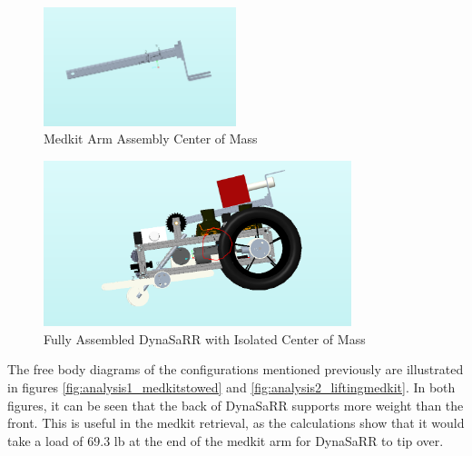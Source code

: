 \begin{figure}[hp]
    \centering
    \includegraphics[width=0.5\textwidth]{Images/medkit_COM.PNG}
    \caption{Medkit Arm Assembly Center of Mass}
    \label{fig:MedkitArm}
\end{figure}
\newpage








\begin{figure}[hp]
    \centering
    \includegraphics[width=0.8\textwidth]{Images/assemblyCOM.PNG}
    \caption{Fully Assembled DynaSaRR with Isolated Center of Mass}
\end{figure}

The free body diagrams of the configurations mentioned previously are illustrated in figures \ref{fig:analysis1_medkitstowed} and \ref{fig:analysis2_liftingmedkit}.  In both figures, it can be seen that the back of DynaSaRR supports more weight than the front.  This is useful in the medkit retrieval, as the calculations show that it would take a load of 69.3 lb at the end of the medkit arm for DynaSaRR to tip over.

